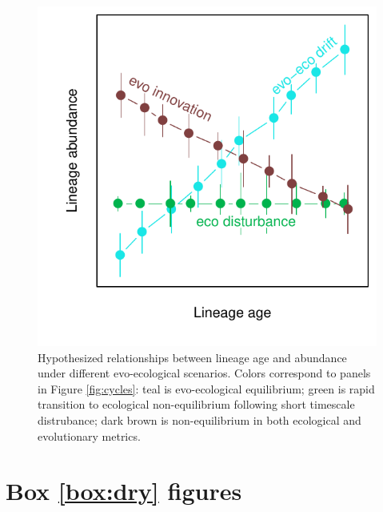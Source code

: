 \documentclass[12pt]{article}
\newcounter{Box}
\begin{document}
\begin{figure}[!hbp]
  \centering
  \includegraphics[scale=1]{fig_age-abund.pdf}
  \caption{Hypothesized relationships between lineage age and
    abundance under different evo-ecological scenarios. Colors
    correspond to panels in Figure \ref{fig:cycles}: teal is
    evo-ecological equilibrium; green is rapid transition to
    ecological non-equilibrium following short timescale distrubance;
    dark brown is non-equilibrium in both ecological and evolutionary
    metrics.}
  \label{fig:age-abund}
\end{figure}

\pagebreak

\section*{Box \ref{box:dry} figures}

\setcounter{figure}{0}
\renewcommand{\thefigure}{\Roman{figure}}
\end{document}
